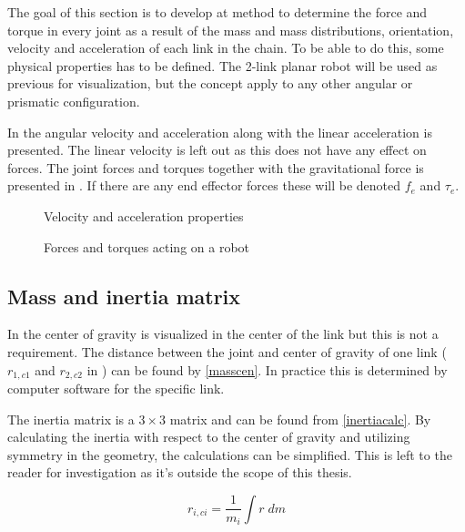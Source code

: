 The goal of this section is to develop at method to determine the force and torque in every joint as a result of the mass and mass distributions, orientation, velocity and acceleration of each link in the chain. To be able to do this, some physical properties has to be defined. The 2-link planar robot will be used as previous for visualization, but the concept apply to any other angular or prismatic configuration.

In  the angular velocity and acceleration along with the linear acceleration is presented. The linear velocity is left out as this does not have any effect on forces. The joint forces and torques together with the gravitational force is presented in . If there are any end effector forces these will be denoted $f_e$ and $\tau_e$.
\begin{figure}[h!]    
    \centering           
    \def\svgwidth{.9\columnwidth}
    
    \caption{Velocity and acceleration properties}
    \label{speed}
    \vspace{-1cm}
\end{figure}

\begin{figure}[h!]    
    \centering           
    \def\svgwidth{.9\columnwidth}
    
    \caption{Forces and torques acting on a robot}
    \label{forces}
\end{figure}

\subsection{Mass and inertia matrix}

In  the center of gravity is visualized in the center of the link but this is not a requirement. The distance between the joint and center of gravity of one link ($r_{1,c1}$ and $r_{2,c2}$ in ) can be found by \eqref{masscen}. In practice this is determined by computer software for the specific link.

The inertia matrix is a $3\times 3$ matrix and can be found from \eqref{inertiacalc}. By calculating the inertia with respect to the center of gravity and utilizing symmetry in the geometry, the calculations can be simplified. This is left to the reader for investigation as it's outside the scope of this thesis.

\begin{equation}\label{masscen}
r_{i,ci} = \frac{1}{m_i}\int r \; dm
\end{equation}

